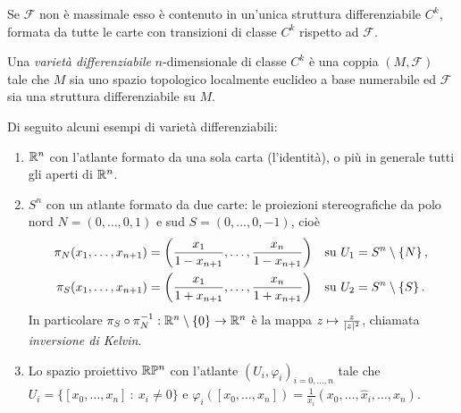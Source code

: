  \begin{remark}
  Se $\mathcal F$ non è massimale esso è contenuto in un'unica struttura differenziabile $C^k$,
  formata da tutte le carte con transizioni di classe $C^k$ rispetto ad $\mathcal F$.
 \end{remark}
 
 \begin{definition} 
  Una \emph{varietà differenziabile} $n$-dimensionale di classe $C^k$ è una coppia $(M, \mathcal F)$ tale che $M$ sia uno spazio topologico localmente euclideo a base numerabile ed $\mathcal F$ sia una struttura differenziabile su $M$.
 \end{definition}
 
\begin{example}
	Di seguito alcuni esempi di varietà differenziabili: 
	\begin{enumerate}
	\item $\mathbb R^n$ con l'atlante formato da una sola carta (l'identità), o più in generale tutti gli aperti di $\mathbb R^n$.
	\item $S^n$ con un atlante formato da due carte: le proiezioni stereografiche da polo nord $N=(0,\ldots,0,1)$ e sud $S=(0,\ldots,0,-1)$, cioè 
	\begin{align*}
		\pi_N(x_1,\ldots,x_{n+1}) = \left( \frac{x_1}{1-x_{n+1}},\ldots,\frac{x_n}{1-x_{n+1}} \right) &\quad \text{su $U_1=S^n\setminus \{N\}$} \, \text{, }\\
		\pi_S(x_1,\ldots,x_{n+1}) = \left( \frac{x_1}{1+x_{n+1}},\ldots,\frac{x_n}{1+x_{n+1}} \right) &\quad \text{su $U_2=S^n\setminus \{S\}$} \, \text{. }
	\end{align*}
	In particolare $\pi_S\circ \pi_N^{-1}:\mathbb R^n\setminus\{0\} \to \mathbb R^n$ è la mappa $z\mapsto \frac z{\lvert z\rvert^2}$, chiamata \emph{inversione di Kelvin}.

   \item Lo spazio proiettivo $\mathbb R\mathbb P^n$ con l'atlante $(U_i,\varphi_i)_{i=0,\dots,n}$ tale che $U_i=\{ [x_0,\dots,x_n]\ :\ x_i\neq 0\}$ e $\varphi_i([x_0,\dots,x_n])=\frac 1{x_i}(x_0,\dots,\hat x_i,\dots,x_n)$.
  \end{enumerate}
 \end{example}
 
